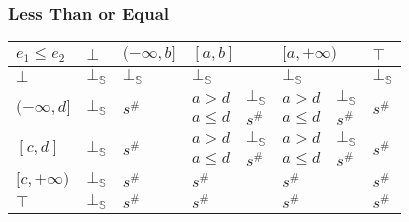 \documentclass{beamer}
\begin{document}
    
        \begin{frame}
            \frametitle{Less Than or Equal}
    \begin{table}[]
        \begin{tabular}{|l|l|l|ll|ll|l|}
        \hline
        $e_1 \le e_2$                   & $\bot$                  & $(-\infty, b]$          & \multicolumn{2}{l|}{$[a, b]$} & \multicolumn{2}{l|}{$[a, +\infty)$} & $\top$                  \\ \hline
        $\bot$                          & $\bot_\mathbb{S}$                  & $\bot_\mathbb{S}$                  & \multicolumn{2}{l|}{$\bot_\mathbb{S}$}   & \multicolumn{2}{l|}{$\bot_\mathbb{S}$}         & $\bot_\mathbb{S}$                  \\ \hline
        \multirow{2}{*}{$(-\infty, d]$} & \multirow{2}{*}{$\bot_\mathbb{S}$} & \multirow{2}{*}{$s^\#$} & $a > d$         & $\bot_\mathbb{S}$      & $a > d$            & $\bot_\mathbb{S}$         & \multirow{2}{*}{$s^\#$} \\
                                        &                         &                         & $a \le d$       & $s^\#$      & $a \le d$          & $s^\#$         &                         \\ \hline
        \multirow{2}{*}{$[c, d]$}       & \multirow{2}{*}{$\bot_\mathbb{S}$} & \multirow{2}{*}{$s^\#$} & $a > d$         & $\bot_\mathbb{S}$      & $a > d$            & $\bot_\mathbb{S}$         & \multirow{2}{*}{$s^\#$} \\
                                        &                         &                         & $a \le d$       & $s^\#$      & $a \le d$          & $s^\#$         &                         \\ \hline
        $[c, +\infty)$                  & $\bot_\mathbb{S}$                  & $s^\#$                  & \multicolumn{2}{l|}{$s^\#$}   & \multicolumn{2}{l|}{$s^\#$}         & $s^\#$                  \\ \hline
        $\top$                          & $\bot_\mathbb{S}$                  & $s^\#$                  & \multicolumn{2}{l|}{$s^\#$}   & \multicolumn{2}{l|}{$s^\#$}         & $s^\#$                  \\ \hline
        \end{tabular}
        \end{table}
    \end{frame}
    
\end{document}
